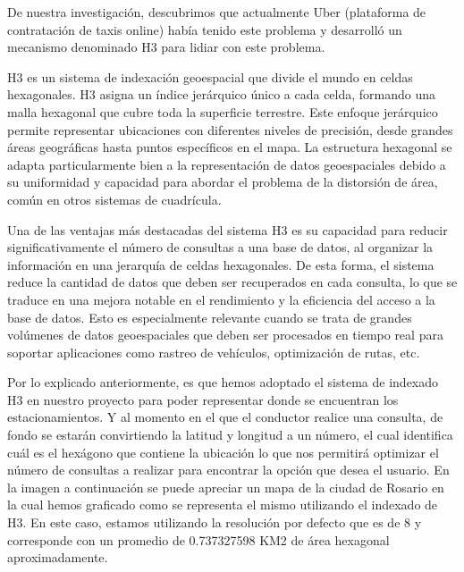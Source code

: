 De nuestra investigación, descubrimos que actualmente Uber (plataforma de contratación de taxis online) había tenido este problema y desarrolló un mecanismo denominado H3 para lidiar con este problema.


H3 es un sistema de indexación geoespacial que divide el mundo en celdas hexagonales. H3 asigna un índice jerárquico único a cada celda, formando una malla hexagonal que cubre toda la superficie terrestre. Este enfoque jerárquico permite representar ubicaciones con diferentes niveles de precisión, desde grandes áreas geográficas hasta puntos específicos en el mapa. La estructura hexagonal se adapta particularmente bien a la representación de datos geoespaciales debido a su uniformidad y capacidad para abordar el problema de la distorsión de área, común en otros sistemas de cuadrícula.


Una de las ventajas más destacadas del sistema H3 es su capacidad para reducir significativamente el número de consultas a una base de datos, al organizar la información en una jerarquía de celdas hexagonales. De esta forma, el sistema reduce la cantidad de datos que deben ser recuperados en cada consulta, lo que se traduce en una mejora notable en el rendimiento y la eficiencia del acceso a la base de datos. Esto es especialmente relevante cuando se trata de grandes volúmenes de datos geoespaciales que deben ser procesados en tiempo real para soportar aplicaciones como rastreo de vehículos, optimización de rutas, etc.

Por lo explicado anteriormente, es que hemos adoptado el sistema de indexado H3 en nuestro proyecto para poder representar donde se encuentran los estacionamientos. Y al momento en el que el conductor realice una consulta, de fondo se estarán convirtiendo la latitud y longitud a un número, el cual identifica cuál es el hexágono que contiene la ubicación lo que nos permitirá optimizar el número de consultas a realizar para encontrar la opción que desea el usuario. En la imagen a continuación se puede apreciar un mapa de la ciudad de Rosario en la cual hemos graficado como se representa el mismo utilizando el indexado de H3. En este caso, estamos utilizando la resolución por defecto que es de 8 y corresponde con un promedio de 0.737327598 KM2 de área hexagonal aproximadamente.

